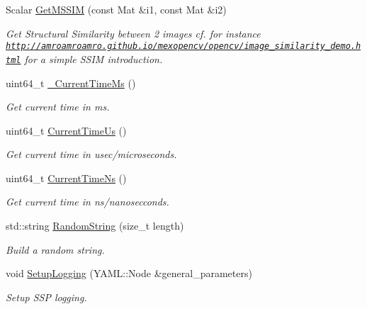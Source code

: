 \begin{DoxyCompactItemize}
Scalar \hyperlink{namespacemoetsi_1_1ssp_ae44d43d11d27495335b5494d0cff7601}{Get\+M\+S\+S\+IM} (const Mat \&i1, const Mat \&i2)
\begin{DoxyCompactList}\small\item\em Get Structural Similarity between 2 images cf. for instance \href{http://amroamroamro.github.io/mexopencv/opencv/image_similarity_demo.html}{\tt http\+://amroamroamro.\+github.\+io/mexopencv/opencv/image\+\_\+similarity\+\_\+demo.\+html} for a simple S\+S\+IM introduction. \end{DoxyCompactList}\item 
uint64\+\_\+t \hyperlink{namespacemoetsi_1_1ssp_a2e6df4e4be7651adce19778f4efb5de0}{\+\_\+\+Current\+Time\+Ms} ()
\begin{DoxyCompactList}\small\item\em Get current time in ms. \end{DoxyCompactList}\item 
uint64\+\_\+t \hyperlink{namespacemoetsi_1_1ssp_ad7107897c233642c927f0129f2aea2e0}{Current\+Time\+Us} ()
\begin{DoxyCompactList}\small\item\em Get current time in usec/microseconds. \end{DoxyCompactList}\item 
uint64\+\_\+t \hyperlink{namespacemoetsi_1_1ssp_ae09a8f6b1d89b0bdb6eec602dd581192}{Current\+Time\+Ns} ()
\begin{DoxyCompactList}\small\item\em Get current time in ns/nanosecconds. \end{DoxyCompactList}\item 
\mbox{\label{namespacemoetsi_1_1ssp_ac615e71e018ead7a1598be1b67079f93}} 
std\+::string \hyperlink{namespacemoetsi_1_1ssp_ac615e71e018ead7a1598be1b67079f93}{Random\+String} (size\+\_\+t length)
\begin{DoxyCompactList}\small\item\em Build a random string. \end{DoxyCompactList}\item 
void \hyperlink{namespacemoetsi_1_1ssp_a732d178071710fdceab189671f2d7c25}{Setup\+Logging} (Y\+A\+M\+L\+::\+Node \&general\+\_\+parameters)
\begin{DoxyCompactList}\small\item\em Setup S\+SP logging. \end{DoxyCompactList}\item 

\end{DoxyCompactItemize}
